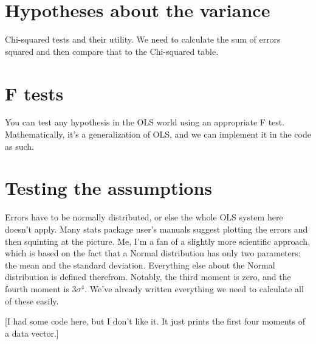 \section{Hypotheses about the variance}
Chi-squared tests and their utility. We need to calculate the sum of errors squared 
and then compare that to the Chi-squared table. 

\section{F tests}

You can test any hypothesis in the OLS world using an appropriate F test.
Mathematically, it's a generalization of OLS, and we can implement it
in the code as such.


\section{Testing the assumptions} Errors have to be normally distributed, or else
the whole OLS system here doesn't apply. Many stats package user's manuals
suggest plotting the errors and then squinting at the picture. Me, I'm a
fan of a slightly more scientific approach, which is based on the fact
that a Normal distribution has only two parameters: the mean and the
standard deviation. Everything else about the Normal distribution is
defined therefrom. Notably, the third moment is zero, and the fourth
moment is $3 \sigma^4$. We've already written everything we need to calculate all of these easily.


[I had some code here, but I don't like it. It just prints the first four moments of a data vector.]

